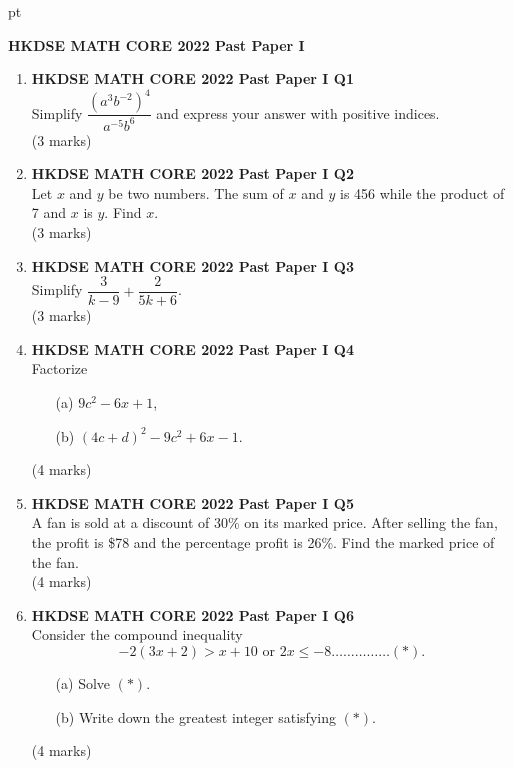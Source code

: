 \documentclass[12pt]{article}
\begin{document}
 pt
\begin{center}
	{\large \bf HKDSE MATH CORE 2022 Past Paper I}\\
	\vspace{2 mm}

\end{center}
\vspace{0.05cm}

\begin{enumerate}
	\item \textbf{HKDSE MATH CORE 2022 Past Paper I Q1}\\
	Simplify $\dfrac{(a^3b^{-2})^4}{a^{-5}b^6}$ and express your answer with positive indices. \\(3 marks)	
	
	\item \textbf{HKDSE MATH CORE 2022 Past Paper I Q2}\\
	Let $x$ and $y$ be two numbers. The sum of $x$ and $y$ is 456 while the product of 7 and $x$ is $y$. Find $x$. \\(3 marks)

	\item \textbf{HKDSE MATH CORE 2022 Past Paper I Q3}\\
	Simplify $\dfrac{3}{k - 9} + \dfrac{2}{5k + 6}$. \\(3 marks)

	\item \textbf{HKDSE MATH CORE 2022 Past Paper I Q4}\\
	Factorize
	\begin{enumerate}
		\item[(a)] $9c^2 - 6x + 1$,
		\item[(b)] $(4c + d)^2 - 9c^2 + 6x - 1$.
	\end{enumerate}
	(4 marks)

	\item \textbf{HKDSE MATH CORE 2022 Past Paper I Q5}\\
	A fan is sold at a discount of 30\% on its marked price. After selling the fan, the profit is \$78 and the percentage profit is 26\%. Find the marked price of the fan. \\(4 marks)

	\item \textbf{HKDSE MATH CORE 2022 Past Paper I Q6}\\
	Consider the compound inequality $$-2(3x + 2) > x + 10 \text{ or } 2x \leq -8 \dots\dots\dots\dots\dots (*) .$$
	\begin{enumerate}
		\item[(a)] Solve $(*)$.
		\item[(b)] Write down the greatest integer satisfying $(*)$.	
	\end{enumerate}
	(4 marks)


\end{enumerate}
\end{document}
